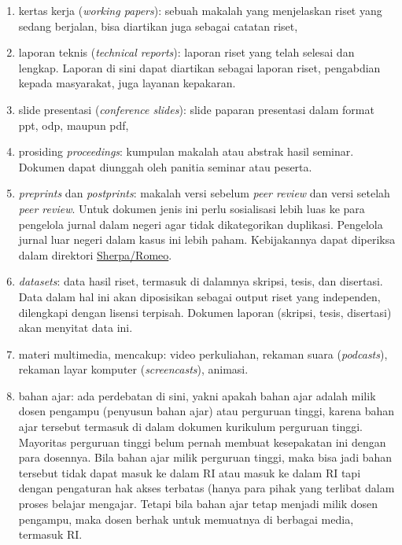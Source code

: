 \documentclass[a4paper]{article}
\begin{document}
\begin{enumerate}
\item kertas kerja (\textit{working papers}): sebuah makalah yang menjelaskan riset yang sedang berjalan, bisa diartikan juga sebagai catatan riset, 

\item laporan teknis (\textit{technical reports}): laporan riset yang telah selesai dan lengkap. Laporan di sini dapat diartikan sebagai laporan riset, pengabdian kepada masyarakat, juga layanan kepakaran.

\item slide presentasi (\textit{conference slides}): slide paparan presentasi dalam format ppt, odp, maupun pdf,

\item prosiding \textit{proceedings}: kumpulan makalah atau abstrak hasil seminar. Dokumen dapat diunggah oleh panitia seminar atau peserta.

\item \textit{preprints} dan \textit{postprints}: makalah versi sebelum \textit{peer review} dan versi setelah \textit{peer review}. Untuk dokumen jenis ini perlu sosialisasi lebih luas ke para pengelola jurnal dalam negeri agar tidak dikategorikan duplikasi. Pengelola jurnal luar negeri dalam kasus ini lebih paham. Kebijakannya dapat diperiksa dalam direktori \href{http://www.sherpa.ac.uk/romeo/index.php}{Sherpa/Romeo}. 

\item \textit{datasets}: data hasil riset, termasuk di dalamnya skripsi, tesis, dan disertasi. Data dalam hal ini akan diposisikan sebagai output riset yang independen, dilengkapi dengan lisensi terpisah. Dokumen laporan (skripsi, tesis, disertasi) akan menyitat data ini. 

\item materi multimedia, mencakup: video perkuliahan, rekaman suara (\textit{podcasts}), rekaman layar komputer (\textit{screencasts}), animasi.

\item bahan ajar: ada perdebatan di sini, yakni apakah bahan ajar adalah milik dosen pengampu (penyusun bahan ajar) atau perguruan tinggi, karena bahan ajar tersebut termasuk di dalam dokumen kurikulum perguruan tinggi. Mayoritas perguruan tinggi belum pernah membuat kesepakatan ini dengan para dosennya. Bila bahan ajar milik perguruan tinggi, maka bisa jadi bahan tersebut tidak dapat masuk ke dalam RI atau masuk ke dalam RI tapi dengan pengaturan hak akses terbatas (hanya para pihak yang terlibat dalam proses belajar mengajar. Tetapi bila bahan ajar tetap menjadi milik dosen pengampu, maka dosen berhak untuk memuatnya di berbagai media, termasuk RI.


\end{enumerate}
\end{document}
